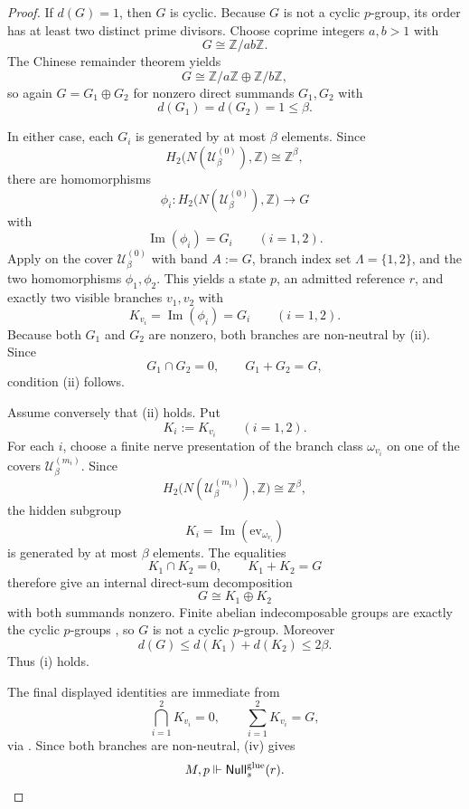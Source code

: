 \begin{proof}
If $d(G)=1$, then $G$ is cyclic. Because $G$ is not a cyclic $p$-group, its order has at least two distinct prime divisors. Choose coprime integers $a,b>1$ with
\[
G\cong \mathbb Z/ab\mathbb Z.
\]
The Chinese remainder theorem yields
\[
G\cong \mathbb Z/a\mathbb Z\oplus \mathbb Z/b\mathbb Z,
\]
so again $G=G_1\oplus G_2$ for nonzero direct summands $G_1,G_2$ with
\[
d(G_1)=d(G_2)=1\le \beta.
\]

In either case, each $G_i$ is generated by at most $\beta$ elements. Since
\[
H_2\bigl(N(\mathcal U_\beta^{(0)}),\mathbb Z\bigr)\cong \mathbb Z^\beta,
\]
there are homomorphisms
\[
\phi_i:H_2\bigl(N(\mathcal U_\beta^{(0)}),\mathbb Z\bigr)\to G
\]
with
\[
\operatorname{Im}(\phi_i)=G_i
\qquad
(i=1,2).
\]
Apply  on the cover $\mathcal U_\beta^{(0)}$ with band $A:=G$, branch index set $\Lambda=\{1,2\}$, and the two homomorphisms $\phi_1,\phi_2$. This yields a state $p$, an admitted reference $r$, and exactly two visible branches $v_1,v_2$ with
\[
K_{v_i}=\operatorname{Im}(\phi_i)=G_i
\qquad
(i=1,2).
\]
Because both $G_1$ and $G_2$ are nonzero, both branches are non-neutral by (ii). Since
\[
G_1\cap G_2=0,
\qquad
G_1+G_2=G,
\]
condition \textup{(ii)} follows.

Assume conversely that \textup{(ii)} holds. Put
\[
K_i:=K_{v_i}
\qquad
(i=1,2).
\]
For each $i$, choose a finite nerve presentation of the branch class $\omega_{v_i}$ on one of the covers $\mathcal U_\beta^{(m_i)}$. Since
\[
H_2\bigl(N(\mathcal U_\beta^{(m_i)}),\mathbb Z\bigr)\cong \mathbb Z^\beta,
\]
the hidden subgroup
\[
K_i=\operatorname{Im}(\mathrm{ev}_{\omega_{v_i}})
\]
is generated by at most $\beta$ elements. The equalities
\[
K_1\cap K_2=0,
\qquad
K_1+K_2=G
\]
therefore give an internal direct-sum decomposition
\[
G\cong K_1\oplus K_2
\]
with both summands nonzero. Finite abelian indecomposable groups are exactly the cyclic $p$-groups \cite[Chap.~12]{DummitFoote2004}, so $G$ is not a cyclic $p$-group. Moreover
\[
d(G)\le d(K_1)+d(K_2)\le 2\beta.
\]
Thus \textup{(i)} holds.

The final displayed identities are immediate from
\[
\bigcap_{i=1}^2 K_{v_i}=0,
\qquad
\sum_{i=1}^2 K_{v_i}=G,
\]
via . Since both branches are non-neutral, (iv) gives
\[
M,p\Vdash \mathsf{Null}_s^{\mathrm{glue}}(r).
\qedhere
\]
\end{proof}

